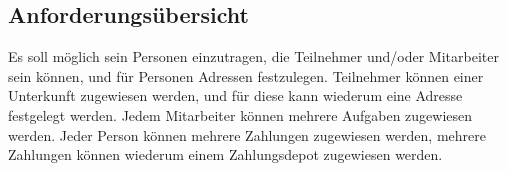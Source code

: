 \subsection{Anforderungsübersicht}
Es soll möglich sein Personen einzutragen, die Teilnehmer und/oder Mitarbeiter sein können, und für Personen Adressen festzulegen. Teilnehmer können einer Unterkunft zugewiesen werden, und für diese kann wiederum eine Adresse festgelegt werden. Jedem Mitarbeiter können mehrere Aufgaben zugewiesen werden. Jeder Person können mehrere Zahlungen zugewiesen werden, mehrere Zahlungen können wiederum einem Zahlungsdepot zugewiesen werden.  
